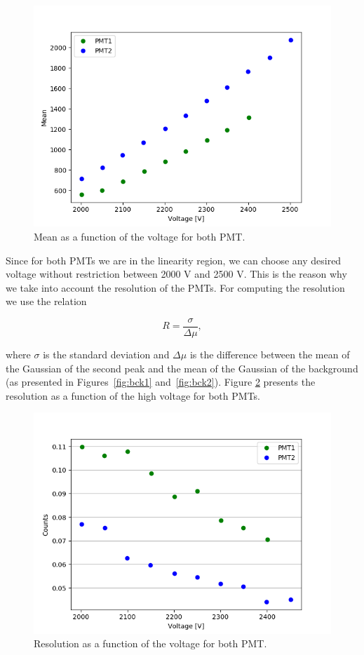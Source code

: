 \documentclass[10pt,swedish, openany]{book}
\begin{document}
\begin{figure}[H]
\includegraphics[scale=0.6]{mean.png}
\centering
\caption{Mean as a function of the voltage for both PMT.}
\label{fig:mean}
\end{figure}

Since for both PMTs we are in the linearity region, we can choose any desired voltage without restriction between 2000 V and 2500 V. This is the reason why we take into account the resolution of the PMTs. For computing the resolution we use the relation

\begin{equation}
    R = \frac{\sigma}{\Delta\mu},
\end{equation}

where $\sigma$ is the standard deviation and $\Delta\mu$ is the difference between the mean of the Gaussian of the second peak and the mean of the Gaussian of the background (as presented in Figures~\ref{fig:bck1} and~\ref{fig:bck2}). Figure \ref{fig:res} presents the resolution as a function of the high voltage for both PMTs.

\begin{figure}[H]
\includegraphics[scale=0.6]{Resolution.png}
\centering
\caption{Resolution as a function of the voltage for both PMT.}
\label{fig:res}
\end{figure}
\end{document}

